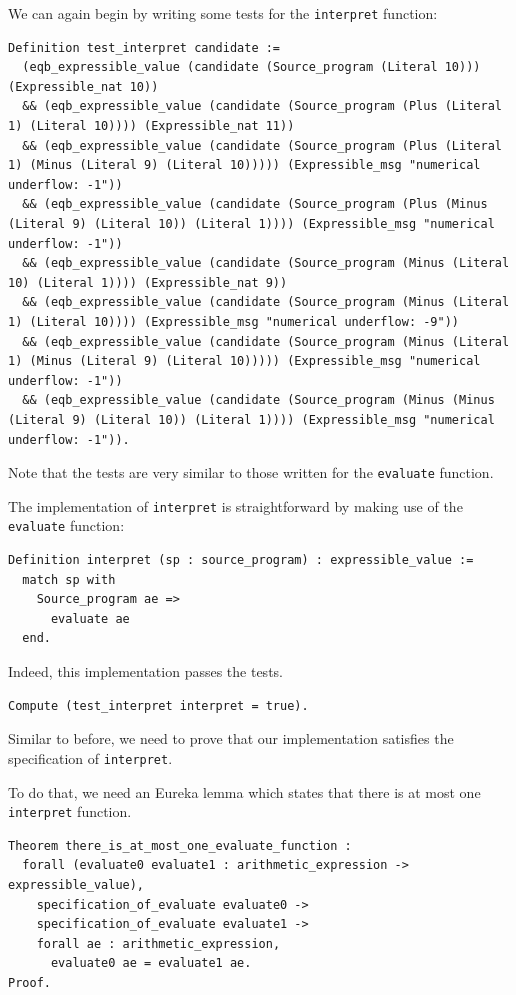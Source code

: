 \documentclass{article}
\begin{document}
We can again begin by writing some tests for the \texttt{interpret} function:

\begin{lstlisting}
Definition test_interpret candidate :=
  (eqb_expressible_value (candidate (Source_program (Literal 10))) (Expressible_nat 10))
  && (eqb_expressible_value (candidate (Source_program (Plus (Literal 1) (Literal 10)))) (Expressible_nat 11))
  && (eqb_expressible_value (candidate (Source_program (Plus (Literal 1) (Minus (Literal 9) (Literal 10))))) (Expressible_msg "numerical underflow: -1"))
  && (eqb_expressible_value (candidate (Source_program (Plus (Minus (Literal 9) (Literal 10)) (Literal 1)))) (Expressible_msg "numerical underflow: -1"))
  && (eqb_expressible_value (candidate (Source_program (Minus (Literal 10) (Literal 1)))) (Expressible_nat 9))
  && (eqb_expressible_value (candidate (Source_program (Minus (Literal 1) (Literal 10)))) (Expressible_msg "numerical underflow: -9"))
  && (eqb_expressible_value (candidate (Source_program (Minus (Literal 1) (Minus (Literal 9) (Literal 10))))) (Expressible_msg "numerical underflow: -1"))
  && (eqb_expressible_value (candidate (Source_program (Minus (Minus (Literal 9) (Literal 10)) (Literal 1)))) (Expressible_msg "numerical underflow: -1")).
\end{lstlisting}

Note that the tests are very similar to those written for the \texttt{evaluate} function. 

The implementation of \texttt{interpret} is straightforward by making use of the \texttt{evaluate} function:

\begin{lstlisting}
Definition interpret (sp : source_program) : expressible_value :=
  match sp with
    Source_program ae =>
      evaluate ae
  end.
\end{lstlisting}

Indeed, this implementation passes the tests.

\begin{lstlisting}
Compute (test_interpret interpret = true).
\end{lstlisting}

Similar to before, we need to prove that our implementation satisfies the specification of \texttt{interpret}.

To do that, we need an Eureka lemma which states that there is at most one \texttt{interpret} function. 

\begin{lstlisting}
Theorem there_is_at_most_one_evaluate_function :
  forall (evaluate0 evaluate1 : arithmetic_expression -> expressible_value),
    specification_of_evaluate evaluate0 ->
    specification_of_evaluate evaluate1 ->
    forall ae : arithmetic_expression,
      evaluate0 ae = evaluate1 ae.
Proof.
\end{lstlisting}
\end{document}
